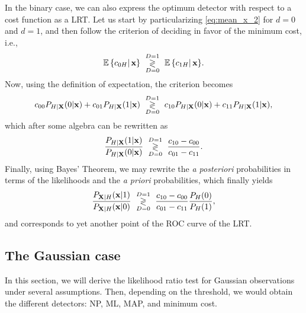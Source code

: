 In the binary case, we can also express the optimum detector with respect to a cost function as a LRT. Let us start by particularizing \eqref{eq:mean_x_2} for $d=0$ and $d=1$, and then follow the criterion of deciding in favor of the minimum cost, i.e.,
$$\mathbb{E}\left\{ c_{0H}\right|{\bf x}\} \,\, \underset{D=0}{\overset{D=1}{\gtrless}}\,\, \mathbb{E}\left\{ c_{1H}\right|{\bf x}\}.$$
Now, using the definition of expectation, the criterion becomes
$$c_{00}P_{H|{\bf X}}(0|{\bf x}) + c_{01} P_{H|{\bf X}}(1|{\bf x})\,\, \underset{D=0}{\overset{D=1}{\gtrless}}\,\, c_{10}P_{H|{\bf X}}(0|{\bf x}) + c_{11} P_{H|{\bf X}}(1|{\bf x}),$$
which after some algebra can be rewritten as
$$\displaystyle\frac{P_{H|{\bf X}}(1|{\bf x})}{P_{H|{\bf X}}(0|{\bf x})}\,\, \underset{D=0}{\overset{D=1}{\gtrless}}\,\, \displaystyle\frac{c_{10}-c_{00}}{c_{01}-c_{11}}.$$
Finally, using Bayes' Theorem, we may rewrite the \emph{a posteriori} probabilities in terms of the likelihoods and the \emph{a priori} probabilities, which finally yields
$$\displaystyle\frac{P_{{\bf X}|H}({\bf x}|1)}{P_{{\bf X}|H}({\bf x}|0)}\,\, \underset{D=0}{\overset{D=1}{\gtrless}}\,\, \displaystyle\frac{c_{10}-c_{00}}{c_{01}-c_{11}} \displaystyle\frac{P_H(0)}{P_H(1)},$$
and corresponds to yet another point of the ROC curve of the LRT.

\subsection{The Gaussian case}

In this section, we will derive the likelihood ratio test for Gaussian observations under several assumptions. Then, depending on the threshold, we would obtain the different detectors: NP, ML, MAP, and minimum cost.

